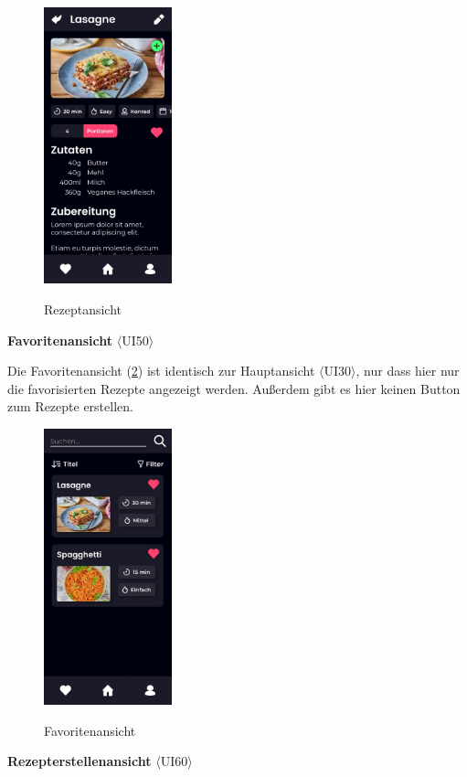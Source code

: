 \documentclass[parskip=full]{scrartcl}
\begin{document}
\begin{figure}[!htp]
    \centering
    \includegraphics[height=80mm]{images/section7/RecipeView.jpg}
    \label{fig:A75}
    \caption{Rezeptansicht}
\end{figure}

\textbf{Favoritenansicht} $\langle$UI50$\rangle$

Die Favoritenansicht (\ref{fig:A76}) ist identisch zur Hauptansicht $\langle$UI30$\rangle$, nur dass hier nur die favorisierten Rezepte angezeigt werden. Außerdem gibt es hier keinen Button zum Rezepte erstellen.
\newpage
\begin{figure}[!htp]
    \centering
    \includegraphics[height=80mm]{images/section7/FavouritesView.jpg}
    \label{fig:A76}
    \caption{Favoritenansicht}
\end{figure}

\textbf{Rezepterstellenansicht} $\langle$UI60$\rangle$
\end{document}
